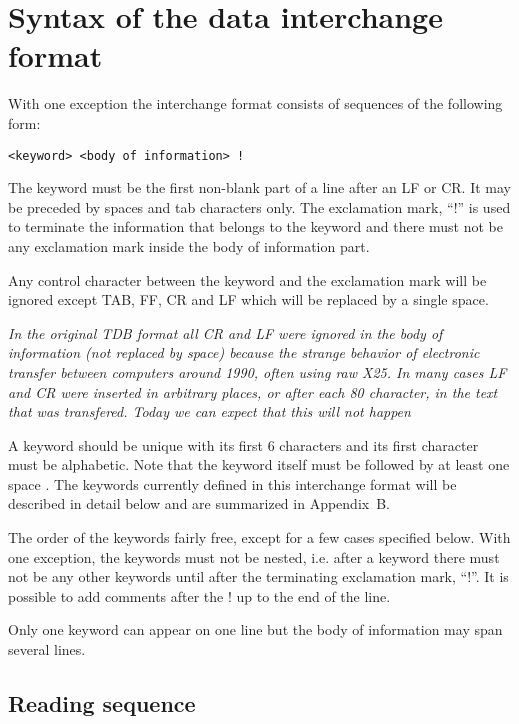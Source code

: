 \documentclass[12pt]{article}
\begin{document}
\section{Syntax of the data interchange format}\label{sec:keyword}

With one exception the interchange format consists of sequences of the
following form:

\begin{verbatim}
<keyword> <body of information> !
\end{verbatim}

The keyword must be the first non-blank part of a line after an LF or
CR.  It may be preceded by spaces and tab characters only.  The
exclamation mark, ``!''  is used to terminate the information that
belongs to the keyword and there must not be any exclamation mark
inside the body of information part.

Any control character between the keyword and the exclamation mark
will be ignored except TAB, FF, CR and LF which will be replaced by a
single space.

{\em In the original TDB format all CR and LF were ignored in the body
  of information (not replaced by space) because the strange behavior
  of electronic transfer between computers around 1990, often using
  raw X25.  In many cases LF and CR were inserted in arbitrary places,
  or after each 80 character, in the text that was transfered.  Today
  we can expect that this will not happen}

A keyword should be unique with its first 6 characters and its first
character must be alphabetic.  Note that the keyword itself must be
followed by at least one space .  The keywords currently defined in
this interchange format will be described in detail below and are
summarized in Appendix~B.

The order of the keywords fairly free, except for a few cases
specified below.  With one exception, the keywords must not be nested,
i.e.  after a keyword there must not be any other keywords until after
the terminating exclamation mark, ``!''.  It is possible to add
comments after the ! up to the end of the line.

Only one keyword can appear on one line but the body of information
may span several lines.

\subsection{Reading sequence}
\end{document}
